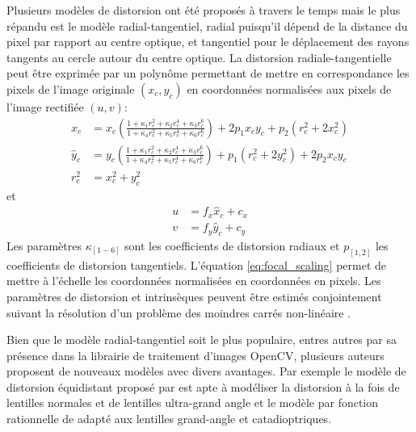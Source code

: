 Plusieurs modèles de distorsion ont été proposés à travers le temps mais le plus répandu est le modèle radial-tangentiel, radial puisqu'il dépend de la distance du pixel par rapport au centre optique, et tangentiel pour le déplacement des rayons tangents au cercle autour du centre optique. La distorsion radiale-tangentielle peut être exprimée par un polynôme permettant de mettre en correspondance les pixels de l'image originale $(x_c, y_c)$ en coordonnées normalisées aux pixels de l'image rectifiée $(u, v)$:
\begin{equation}
  \begin{aligned}
    \hat{x}_c &= x_c\left(\frac{1 + \kappa_1r_c^2 + \kappa_2r_c^4 + \kappa_3r_c^6}{1 + \kappa_4r_c^2 + \kappa_5r_c^4 + \kappa_6r_c^6}\right) + 2p_1 x_c y_c + p_2(r_c^2 + 2 x_c^2) \\
    \hat{y}_c &= y_c\left(\frac{1 + \kappa_1r_c^2 + \kappa_2r_c^4 + \kappa_3r_c^6}{1 + \kappa_4r_c^2 + \kappa_5r_c^4 + \kappa_6r_c^6}\right) + p_1 (r_c^2 + 2 y_c^2) + 2p_2 x_c y_c \\
    r_c^2     &= x_c^2 + y_c^2
    \label{eq:rectification}
  \end{aligned}
\end{equation}
et
\begin{equation}
  \begin{aligned}
    u & = f_x \hat{x}_c + c_x\\
    v &= f_y \hat{y}_c + c_y
    \label{eq:focal_scaling}
  \end{aligned}
\end{equation}
Les paramètres $\kappa_{[1-6]}$ sont les coefficients de distorsion radiaux et $p_{[1,2]}$ les coefficients de distorsion tangentiels. L'équation \ref{eq:focal_scaling} permet de mettre à l'échelle les coordonnées normalisées en coordonnées en pixels. Les paramètres de distorsion et intrinsèques peuvent être estimés conjointement suivant la résolution d'un problème des moindres carrés non-linéaire \citep{Zhang2000}.

Bien que le modèle radial-tangentiel soit le plus populaire, entres autres par sa présence dans la librairie de traitement d'images OpenCV, plusieurs auteurs proposent de nouveaux modèles avec divers avantages. Par exemple le modèle de distorsion équidistant proposé par \citep{Kannala2006} est apte à modéliser la distorsion à la fois de lentilles normales et de lentilles ultra-grand angle et le modèle par fonction rationnelle de \citep{Claus2005} adapté aux lentilles grand-angle et catadioptriques.

